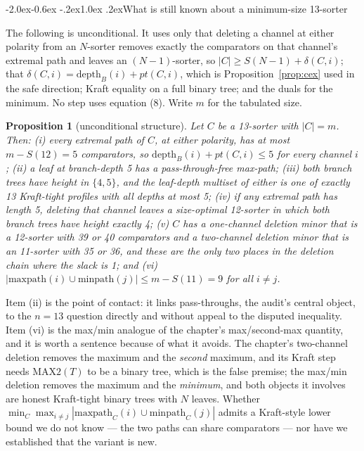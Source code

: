 \documentclass[11pt,a4paper]{article}
\makeatletter
\renewcommand\subsection{\@startsection{subsection}{2}{\z@}%
  {-2.0ex\@plus -0.6ex \@minus -.2ex}{1.0ex \@plus .2ex}{\normalfont\normalsize\bfseries}}
\newtheorem{proposition}[statement]{Proposition}
\newcommand{\MAXTWO}{\mathrm{MAX2}}
\makeatother
\begin{document}
\subsection{What is still known about a minimum-size 13-sorter}

The following is unconditional. It uses only that deleting a channel at either
polarity from an $N$-sorter removes exactly the comparators on that channel's
extremal path and leaves an $(N-1)$-sorter, so $|C| \ge S(N-1) + \delta(C,i)$;
that $\delta(C,i) = \mathrm{depth}_B(i) + pt(C,i)$, which is
Proposition~\ref{prop:cex} used in the safe direction; Kraft equality on a full
binary tree; and the duals for the minimum. No step uses equation (8). Write $m$
for the tabulated size.

\begin{proposition}[unconditional structure]
\label{prop:struct}
Let $C$ be a 13-sorter with $|C| = m$. Then:
(i) every extremal path of $C$, at either polarity, has at most $m - S(12) = 5$
comparators, so $\mathrm{depth}_B(i) + pt(C,i) \le 5$ for every channel $i$;
(ii) a leaf at branch-depth 5 has a pass-through-free max-path;
(iii) both branch trees have height in $\{4,5\}$, and the leaf-depth multiset of
either is one of exactly 13 Kraft-tight profiles with all depths at most 5;
(iv) if any extremal path has length 5, deleting that channel leaves a
size-optimal 12-sorter in which both branch trees have height exactly 4;
(v) $C$ has a one-channel deletion minor that is a 12-sorter with 39 or 40
comparators and a two-channel deletion minor that is an 11-sorter with 35 or 36,
and these are the only two places in the deletion chain where the slack is 1;
and (vi) $|\mathrm{maxpath}(i) \cup \mathrm{minpath}(j)| \le m - S(11) = 9$ for
all $i \ne j$.
\end{proposition}

Item (ii) is the point of contact: it links pass-throughs, the audit's central
object, to the $n = 13$ question directly and without appeal to the disputed
inequality. Item (vi) is the max/min analogue of the chapter's max/second-max
quantity, and it is worth a sentence because of what it avoids. The chapter's
two-channel deletion removes the maximum and the \emph{second} maximum, and its
Kraft step needs $\MAXTWO(T)$ to be a binary tree, which is the false premise;
the max/min deletion removes the maximum and the \emph{minimum}, and both
objects it involves are honest Kraft-tight binary trees with $N$ leaves. Whether
$\min_C \max_{i \ne j} |\mathrm{maxpath}_C(i) \cup \mathrm{minpath}_C(j)|$ admits
a Kraft-style lower bound we do not know --- the two paths can share comparators
--- nor have we established that the variant is new.
\end{document}
